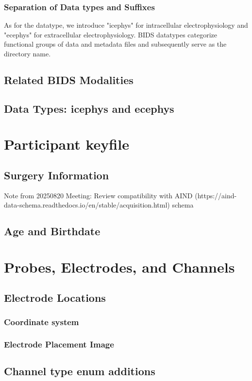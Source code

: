 \documentclass[fleqn,10pt]{wlscirep}
\begin{document}
\subsubsection*{Separation of Data types and Suffixes}
As for the datatype, we introduce "icephys" for intracellular electrophysiology and "ecephys" for extracellular electrophysiology. BIDS datatypes categorize functional groups of data and metadata files and subsequently serve as the directory name.

\subsection*{Related BIDS Modalities}


\subsection*{Data Types: icephys and ecephys}
\section*{Participant keyfile}
\subsection*{Surgery Information}
Note from 20250820 Meeting: Review compatibility with AIND (https://aind-data-schema.readthedocs.io/en/stable/acquisition.html) schema
\subsection*{Age and Birthdate}
\section*{Probes, Electrodes, and Channels}
\subsection*{Electrode Locations}
\subsubsection*{Coordinate system}
\subsubsection*{Electrode Placement Image}
\subsection*{Channel type enum additions}
\end{document}
